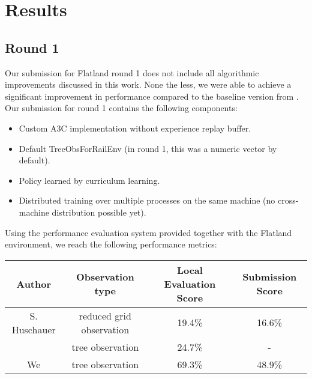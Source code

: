 %
%

\chapter{Results}\label{chap.resultate}
\section{Round 1}
Our submission for Flatland round 1 does not include all algorithmic improvements discussed in this work. None the less, we were able to achieve a significant improvement in performance compared to the baseline version from \cite{flatlandstephan}.
Our submission for round 1 contains the following components:
\begin{itemize}
	\item Custom A3C implementation without experience replay buffer.
	\item Default TreeObsForRailEnv (in round 1, this was a numeric vector by default).
	\item Policy learned by curriculum learning.
	\item Distributed training over multiple processes on the same machine (no cross-machine distribution possible yet).
\end{itemize}
Using the performance evaluation system provided together with the Flatland environment, we reach the following performance metrics:

\begin{tabular}{ |c|c|c|c| } 
	\hline
	\textbf{Author} & \textbf{Observation type} & \textbf{Local Evaluation Score} & \textbf{Submission Score} \\
	\hline
	S. Huschauer & reduced grid observation & 19.4\% & 16.6\% \\
	& tree observation & 24.7\% & - \\
	We & tree observation & 69.3\% & 48.9\% \\
	\hline
\end{tabular}

